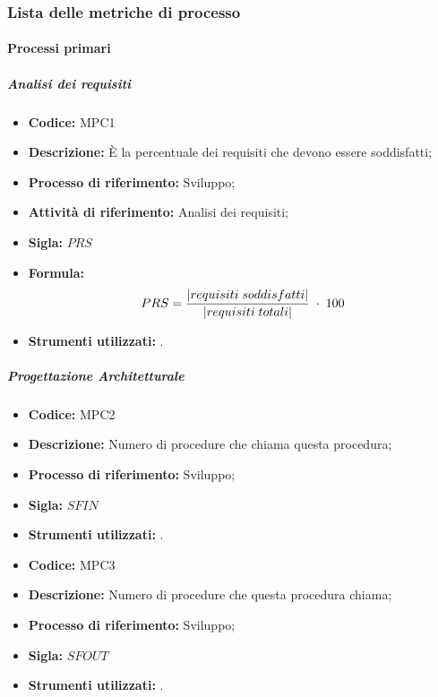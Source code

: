 \subsubsection{Lista delle metriche di processo}
\paragraph{Processi primari}
\subparagraph{Analisi dei requisiti}
    \begin{itemize}
        \item \textbf{Codice:} MPC1
        \item \textbf{Descrizione:} È la percentuale dei requisiti che devono essere soddisfatti;
        \item \textbf{Processo di riferimento:} Sviluppo;
        \item \textbf{Attività di riferimento:} Analisi dei requisiti;
        \item \textbf{Sigla:} $PRS$
        \item \textbf{Formula:} $$PRS = {|requisiti \; soddisfatti| \over |requisiti \; totali|}\; \cdot \; 100$$
        \item \textbf{Strumenti utilizzati:} .
    \end{itemize}
\subparagraph{Progettazione Architetturale}
\begin{itemize}
	\item \textbf{Codice:} MPC2
	\item \textbf{Descrizione:} Numero di procedure che chiama questa procedura;
	\item \textbf{Processo di riferimento:} Sviluppo;
	\item \textbf{Sigla:} $SFIN$
	\item \textbf{Strumenti utilizzati:} .
\end{itemize}
\begin{itemize}
	\item \textbf{Codice:} MPC3
	\item \textbf{Descrizione:} Numero di procedure che questa procedura chiama;
	\item \textbf{Processo di riferimento:} Sviluppo;
	\item \textbf{Sigla:} $SFOUT$
	\item \textbf{Strumenti utilizzati:} .
\end{itemize}
